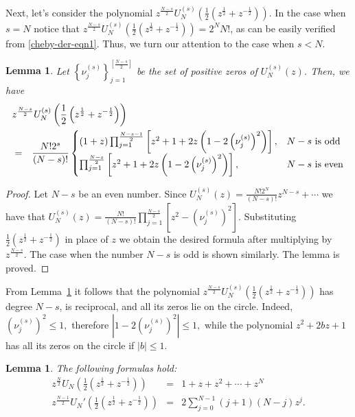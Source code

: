 \documentclass[12pt]{article}
\newtheorem{lemma}[thm]{Lemma}
\newcommand{\pa}[1]{\left(#1\right)}
\newcommand{\br}[1]{\left[#1\right]}
\newcommand{\cb}[1]{\left\{#1\right\}}
\begin{document}
Next, let's consider the polynomial $\displaystyle z^{\frac{N - s}{2}}U_N^{(s)}\pa{\frac{1}{2}\pa{z^{\frac{1}{2}} + z^{-\frac{1}{2}}}}$. In the case when $s = N$ notice that $\displaystyle z^{\frac{N - s}{2}}U_N^{(s)}\pa{\frac{1}{2}\pa{z^{\frac{1}{2}} + z^{-\frac{1}{2}}}} = 2^NN!$, as can be easily verified from \eqref{cheby-der-eqn1}. Thus, we turn our attention to the case when $s < N$.


\begin{lemma} \label{lem1}Let $\displaystyle \cb{\nu_j^{(s)}}_{j = 1}^{\br{\frac{N - s}{2}}}$ be the set of positive zeros of $U_N^{(s)}(z)$. Then, we have
\begin{eqnarray*}
\lefteqn{z^{\frac{N - s}{2}}U_N^{(s)}\pa{\frac{1}{2}\pa{z^{\frac{1}{2}} + z^{-\frac{1}{2}}}}} \\ &=& \frac{N!2^s}{(N - s)!}\begin{cases}
(1 + z)\prod_{j = 1}^{\frac{N - s - 1}{2}}\br{z^2 + 1 + 2z\pa{1 - 2\pa{\nu_j^{(s)}}^2}}, & N - s \mbox{ is odd} \\
\prod_{j = 1}^{\frac{N - s}{2}}\br{z^2 + 1 + 2z\pa{1 - 2\pa{\nu_j^{(s)}}^2}}, & N - s \mbox{ is even}
\end{cases}
\end{eqnarray*}
\end{lemma}

\begin{proof} Let $N - s$ be an even number. Since
$\displaystyle U_N^{(s)}(z) = \frac{N!2^N}{(N - s)!}z^{N - s} + \cdots$
we have that
$\displaystyle U_N^{(s)}(z) = \frac{N!}{(N - s)!}\prod_{j = 1}^{\frac{N - s}{2}}\br{z^2 - \pa{\nu_j^{(s)}}^2}$.
Substituting
$\displaystyle\frac{1}{2}\pa{z^{\frac{1}{2}} + z^{-\frac{1}{2}}}$
in place of $z$ we obtain the desired formula after multiplying by $z^{\frac{N - s}{2}}$. The case when the number $N - s$ is odd is shown similarly. The lemma is proved.
\end{proof}

From Lemma~\ref{lem1} it follows that the polynomial
$\displaystyle z^{\frac{N - s}{2}}U_N^{(s)}\pa{\frac{1}{2}\pa{z^{\frac{1}{2}} + z^{-\frac{1}{2}}}}$ has degree $N - s$, is reciprocal, and all its zeros lie on the circle. Indeed, $\pa{\nu_j^{(s)}}^2\le 1,$ therefore $|1 - 2\pa{\nu_j^{(s)}}^2|\le 1,$ while the polynomial $z^2+2bz+1$ has all its zeros on the circle if $|b|\le 1$.

\begin{lemma}\label{lem2}
The following formulas hold:
\begin{eqnarray*}
z^{\frac{N}{2}}U_N\pa{\frac{1}{2}\pa{z^{\frac{1}{2}} + z^{-\frac{1}{2}}}} &=& 1 + z + z^2 + \cdots + z^N \\
z^{\frac{N - 1}{2}}U_N'\pa{\frac{1}{2}\pa{z^{\frac{1}{2}} + z^{-\frac{1}{2}}}} &=& 2\sum_{j = 0}^{N - 1}(j + 1)(N - j)z^j.
\end{eqnarray*}
\end{lemma}
\end{document}
